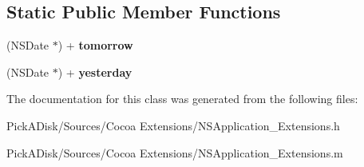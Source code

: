 \subsection*{Static Public Member Functions}
\begin{DoxyCompactItemize}
\item 
\hypertarget{interface_n_s_date_07_my_extensions_08_a29cc67e51dfe14017dc39f4bf0f416a7}{
(NSDate $\ast$) + {\bfseries tomorrow}}
\label{interface_n_s_date_07_my_extensions_08_a29cc67e51dfe14017dc39f4bf0f416a7}

\item 
\hypertarget{interface_n_s_date_07_my_extensions_08_ae9a9bf99746f98d5e6db0a7cb0ddc60d}{
(NSDate $\ast$) + {\bfseries yesterday}}
\label{interface_n_s_date_07_my_extensions_08_ae9a9bf99746f98d5e6db0a7cb0ddc60d}

\end{DoxyCompactItemize}


The documentation for this class was generated from the following files:\begin{DoxyCompactItemize}
\item 
PickADisk/Sources/Cocoa Extensions/NSApplication\_\-Extensions.h\item 
PickADisk/Sources/Cocoa Extensions/NSApplication\_\-Extensions.m\end{DoxyCompactItemize}
